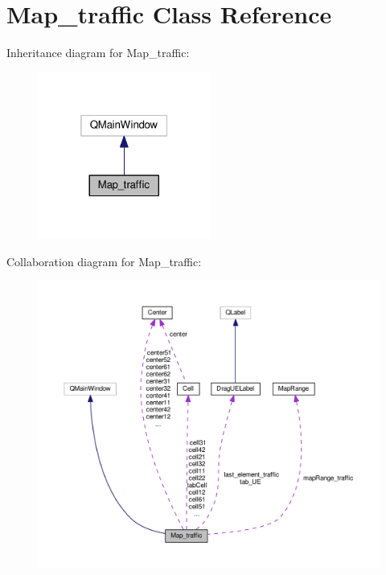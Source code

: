\hypertarget{class_map__traffic}{}\section{Map\+\_\+traffic Class Reference}
\label{class_map__traffic}


Inheritance diagram for Map\+\_\+traffic\+:
\nopagebreak
\begin{figure}[H]
\begin{center}
\leavevmode
\includegraphics[width=160pt]{class_map__traffic__inherit__graph}
\end{center}
\end{figure}


Collaboration diagram for Map\+\_\+traffic\+:
\nopagebreak
\begin{figure}[H]
\begin{center}
\leavevmode
\includegraphics[width=350pt]{class_map__traffic__coll__graph}
\end{center}
\end{figure}
